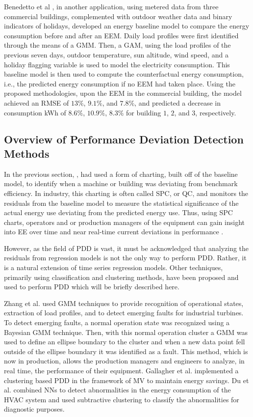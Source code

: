 Benedetto et al \cite{data-driven-MV}, in another application, using metered data from three commercial buildings, complemented with outdoor weather data and binary indicators of holidays, developed an energy baseline model to compare the energy consumption before and after an \ac{EEM}. Daily load profiles were first identified through the means of a \ac{GMM}. Then, a \ac{GAM}, using the load profiles of the previous seven days, outdoor temperature, sun altitude, wind speed, and a holiday flagging variable is used to model the electricity consumption. This baseline model is then used to compute the counterfactual energy consumption, i.e., the predicted energy consumption if no EEM had taken place. Using the proposed methodologies, upon the EEM in the commercial building, the model achieved an RMSE of $13\%$, $9.1\%$, and $7.8\%$, and predicted a decrease in consumption \ac{kWh} of $8.6\%$, $10.9\%$, $8.3\%$ for building $1$, $2$, and $3$, respectively.

\subsection{Overview of Performance Deviation Detection Methods}

In the previous section, \cite{tightening}\cite{cas}\cite{boiler}, had used a form of charting, built off of the baseline model, to identify when a machine or building was deviating from benchmark efficiency. In industry, this charting is often called SPC, or \ac{QC}, and monitors the residuals from the baseline model to measure the statistical significance of the actual energy use deviating from the predicted energy use. Thus, using SPC charts, operators and or production managers of the equipment can gain insight into EE over time and near real-time current deviations in performance \cite{oakland_statistical_2008}.

However, as the field of PDD is vast, it must be acknowledged that analyzing the residuals from regression models is not the only way to perform PDD. Rather, it is a natural extension of time series regression models. Other techniques, primarily using classification and clustering methods, have been proposed and used to perform PDD which will be briefly described here.

Zhang et al. \cite{gas-turbine-faults} used GMM techniques to provide recognition of operational states, extraction of load profiles, and to detect emerging faults for industrial turbines. To detect emerging faults, a normal operation state was recognized using a Bayesian GMM technique. Then, with this normal operation cluster a GMM was used to define an ellipse boundary to the cluster and when a new data point fell outside of the ellipse boundary it was identified as a fault. This method, which is now in production, allows the production managers and engineers to analyze, in real time, the performance of their equipment. Gallagher et al. \cite{intelliMAV} implemented a clustering based PDD in the framework of \ac{MV} to maintain energy savings. Du et al. \cite{fault-HVAC} combined NNs to detect abnormalities in the energy consumption of the HVAC system and used subtractive clustering to classify the abnormalities for diagnostic purposes.

